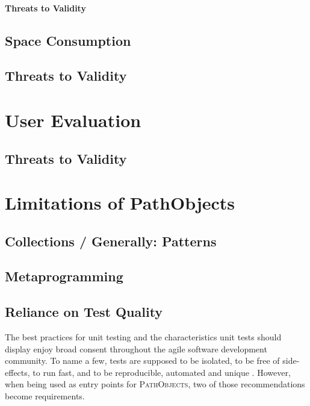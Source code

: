 \paragraph{Threats to Validity}

\subsection{Space Consumption}
\label{s:space-consumption}

\subsection{Threats to Validity}

\section{User Evaluation}
\subsection{Threats to Validity}

\section{Limitations of PathObjects}
\subsection{Collections / Generally: Patterns}
\subsection{Metaprogramming}

\subsection{Reliance on Test Quality} 
\label{ss:LimitationsTestQuality}
The best practices for unit testing and the characteristics unit tests should display enjoy broad consent throughout the agile software development community.
To name a few, tests are supposed to be isolated, to be free of side-effects, to run fast, and to be reproducible, automated and unique \cite{meszaros_xunit_2006, beck_test_2002}.
However, when being used as entry points for \textsc{PathObjects}, two of those recommendations become requirements.

